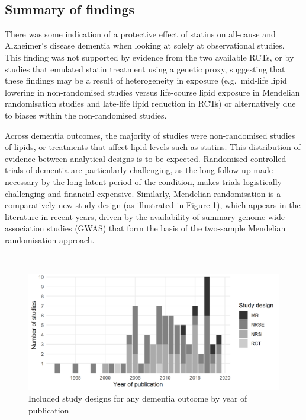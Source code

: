 \documentclass[a4paper, twoside]{templates/ociamthesis}
\begin{document}
~

\hypertarget{summary-of-findings}{%
\subsection{Summary of findings}\label{summary-of-findings}}

There was some indication of a protective effect of statins on all-cause and Alzheimer's disease dementia when looking at solely at observational studies. This finding was not supported by evidence from the two available RCTs, or by studies that emulated statin treatment using a genetic proxy, suggesting that these findings may be a result of heterogeneity in exposure (e.g.~mid-life lipid lowering in non-randomised studies versus life-course lipid exposure in Mendelian randomisation studies and late-life lipid reduction in RCTs) or alternatively due to biases within the non-randomised studies.

Across dementia outcomes, the majority of studies were non-randomised studies of lipids, or treatments that affect lipid levels such as statins. This distribution of evidence between analytical designs is to be expected. Randomised controlled trials of dementia are particularly challenging, as the long follow-up made necessary by the long latent period of the condition, makes trials logistically challenging and financial expensive. Similarly, Mendelian randomisation is a comparatively new study design (as illustrated in Figure \ref{fig:typeByYear}), which appears in the literature in recent years, driven by the availability of summary genome wide association studies (GWAS) that form the basis of the two-sample Mendelian randomisation approach.

~





\begin{figure}[H]
\includegraphics[width=1\linewidth]{figures/sys-rev/type_by_year} \caption[Study designs by year of publication]{Included study designs for any dementia outcome by year of publication}\label{fig:typeByYear}
\end{figure}
\end{document}
